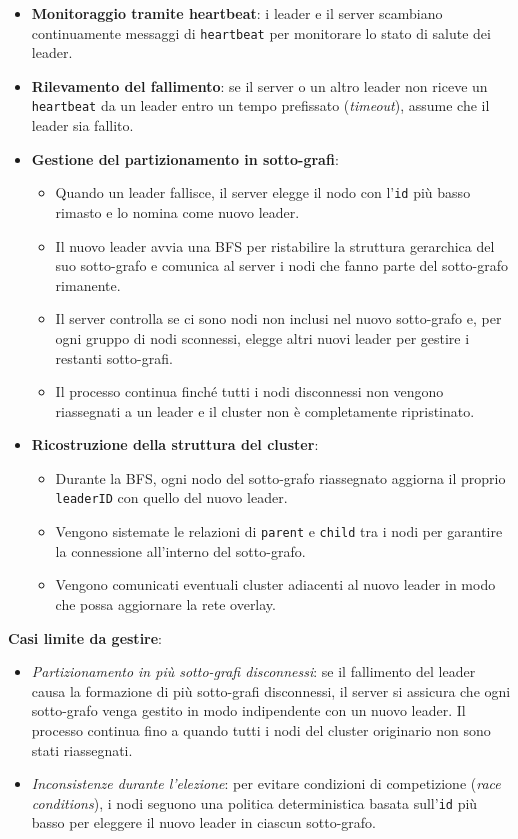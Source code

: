 \documentclass[12pt, a4paper]{report}
\begin{document}
\begin{itemize}
    \item \textbf{Monitoraggio tramite heartbeat}: i leader e il server scambiano continuamente messaggi di \texttt{heartbeat} per monitorare lo stato di salute dei leader.
    \item \textbf{Rilevamento del fallimento}: se il server o un altro leader non riceve un \texttt{heartbeat} da un leader entro un tempo prefissato (\textit{timeout}), assume che il leader sia fallito.
    \item \textbf{Gestione del partizionamento in sotto-grafi}:
    \begin{itemize}
        \item Quando un leader fallisce, il server elegge il nodo con l'\texttt{id} pi\`u basso rimasto e lo nomina come nuovo leader. 
        \item Il nuovo leader avvia una BFS per ristabilire la struttura gerarchica del suo sotto-grafo e comunica al server i nodi che fanno parte del sotto-grafo rimanente.
        \item Il server controlla se ci sono nodi non inclusi nel nuovo sotto-grafo e, per ogni gruppo di nodi sconnessi, elegge altri nuovi leader per gestire i restanti sotto-grafi.
        \item Il processo continua finché tutti i nodi disconnessi non vengono riassegnati a un leader e il cluster non \`e completamente ripristinato.
    \end{itemize}
    \item \textbf{Ricostruzione della struttura del cluster}:
    \begin{itemize}
        \item Durante la BFS, ogni nodo del sotto-grafo riassegnato aggiorna il proprio \texttt{leaderID} con quello del nuovo leader.
        \item Vengono sistemate le relazioni di \texttt{parent} e \texttt{child} tra i nodi per garantire la connessione all'interno del sotto-grafo.
        \item Vengono comunicati eventuali cluster adiacenti al nuovo leader in modo che possa aggiornare la rete overlay.
    \end{itemize}
\end{itemize}

\textbf{Casi limite da gestire}:

\begin{itemize}
    \item \textit{Partizionamento in pi\`u sotto-grafi disconnessi}: se il fallimento del leader causa la formazione di pi\`u sotto-grafi disconnessi, il server si assicura che ogni sotto-grafo venga gestito in modo indipendente con un nuovo leader. Il processo continua fino a quando tutti i nodi del cluster originario non sono stati riassegnati.
    \item \textit{Inconsistenze durante l'elezione}: per evitare condizioni di competizione (\textit{race conditions}), i nodi seguono una politica deterministica basata sull'\texttt{id} pi\`u basso per eleggere il nuovo leader in ciascun sotto-grafo.
\end{itemize}
\end{document}
